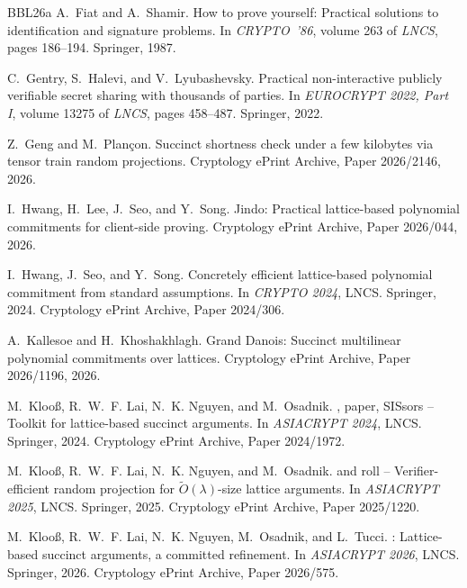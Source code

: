 \begin{thebibliography}{BBL{\etalchar{+}}26a}
A.~Fiat and A.~Shamir.
\newblock How to prove yourself: Practical solutions to identification and signature problems.
\newblock In {\em CRYPTO~'86}, volume 263 of {\em LNCS}, pages 186--194. Springer, 1987.

C.~Gentry, S.~Halevi, and V.~Lyubashevsky.
\newblock Practical non-interactive publicly verifiable secret sharing with thousands of parties.
\newblock In {\em EUROCRYPT 2022, Part I}, volume 13275 of {\em LNCS}, pages 458--487. Springer, 2022.

Z.~Geng and M.~Plan{\c{c}}on.
\newblock Succinct shortness check under a few kilobytes via tensor train random projections.
\newblock Cryptology ePrint Archive, Paper 2026/2146, 2026.

I.~Hwang, H.~Lee, J.~Seo, and Y.~Song.
\newblock Jindo: Practical lattice-based polynomial commitments for client-side proving.
\newblock Cryptology ePrint Archive, Paper 2026/044, 2026.

I.~Hwang, J.~Seo, and Y.~Song.
\newblock Concretely efficient lattice-based polynomial commitment from standard assumptions.
\newblock In {\em CRYPTO 2024}, LNCS. Springer, 2024.
\newblock Cryptology ePrint Archive, Paper 2024/306.

A.~Kallesoe and H.~Khoshakhlagh.
\newblock Grand Danois: Succinct multilinear polynomial commitments over lattices.
\newblock Cryptology ePrint Archive, Paper 2026/1196, 2026.

M.~Kloo{\ss}, R.~W.~F. Lai, N.~K. Nguyen, and M.~Osadnik.
, paper, {SISsors} -- Toolkit for lattice-based succinct arguments.
\newblock In {\em ASIACRYPT 2024}, LNCS. Springer, 2024.
\newblock Cryptology ePrint Archive, Paper 2024/1972.

M.~Kloo{\ss}, R.~W.~F. Lai, N.~K. Nguyen, and M.~Osadnik.
 and roll -- Verifier-efficient random projection for $\tilde{O}(\lambda)$-size lattice arguments.
\newblock In {\em ASIACRYPT 2025}, LNCS. Springer, 2025.
\newblock Cryptology ePrint Archive, Paper 2025/1220.

M.~Kloo{\ss}, R.~W.~F. Lai, N.~K. Nguyen, M.~Osadnik, and L.~Tucci.
: Lattice-based succinct arguments, a committed refinement.
\newblock In {\em ASIACRYPT 2026}, LNCS. Springer, 2026.
\newblock Cryptology ePrint Archive, Paper 2026/575.


\end{thebibliography}
